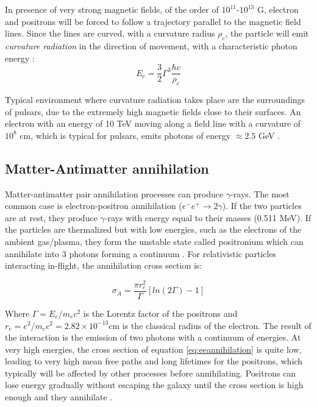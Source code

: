 \documentclass[main.tex]{subfiles}
\begin{document}
In presence of very strong magnetic fields, of the order of $10^{11}$-$10^{13}$ G, electron and positrons will be forced to follow a trajectory parallel to the magnetic field lines. Since the lines are curved, with a curvature radius $\rho_{c}$, the particle will emit \textit{curvature radiation} in the direction of movement, with a characteristic photon energy \cite{Pulsars}:
\begin{equation}
    E_{c} = \frac{3}{2} \Gamma^3\frac{\hbar c}{\rho_c}
\end{equation}

Typical environment where curvature radiation takes place are the surroundings of pulsars, due to the extremely high magnetic fields close to their surfaces. An electron with an energy of 10 TeV moving along a field line with a curvature of $10^8$ cm, which is typical for pulsars, emits photons of energy $\approx 2.5$ GeV \cite{1993MurthyGammaRay}. 



\subsection{Matter-Antimatter annihilation}

Matter-antimatter pair annihilation processes can produce $\gamma$-rays. The most common case is electron-positron annihilation ($e^-e^+\rightarrow 2\gamma$). If the two particles are at rest, they produce $\gamma$-rays with energy equal to their masses (0.511 MeV). If the particles are thermalized but with low energies, such as the electrons of the ambient gas/plasma, they form the unstable state called positronium which can annihilate into 3 photons forming a continuum \cite{2004VHECosmicGammaRadiation}.
For relativistic particles interacting in-flight, the annihilation cross section is:

\begin{equation}\label{eq:eeannihilation}
    \sigma_{A} = \frac{\pi r_{e}^{2}}{\Gamma} [ln(2\Gamma)-1]
\end{equation}

Where $\Gamma=E_e/m_ec^2$ is the Lorentz factor of the positrons and $r_e=e^2/m_ec^2 = 2.82 \times 10^{-13} $cm is the classical radius of the electron. The result of the interaction is the emission of two photons with a continuum of energies. At very high energies, the cross section of equation \ref{eq:eeannihilation} is quite low, leading to very high mean free paths and long lifetimes for the positrons, which typically will be affected by other processes before annihilating. Positrons can lose energy gradually without escaping the galaxy until the cross section is high enough and they annihilate \cite{1993MurthyGammaRay}.
\end{document}
